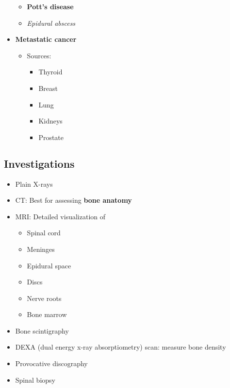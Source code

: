 \documentclass[
  12pt,
]{memoir}
\providecommand{\tightlist}{%
  \setlength{\itemsep}{0pt}\setlength{\parskip}{0pt}}
\begin{document}
\begin{itemize}
  \begin{itemize}
  \tightlist
  \item
    \textbf{Pott's disease}
  \item
    \emph{Epidural abscess}
  \end{itemize}
\item
  \textbf{Metastatic cancer}

  \begin{itemize}
  \tightlist
  \item
    Sources:

    \begin{itemize}
    \tightlist
    \item
      Thyroid
    \item
      Breast
    \item
      Lung
    \item
      Kidneys
    \item
      Prostate
    \end{itemize}
  \end{itemize}
\end{itemize}

\hypertarget{investigations-1}{%
\subsection{Investigations}\label{investigations-1}}

\begin{itemize}
\tightlist
\item
  Plain X-rays
\item
  CT: Best for assessing \textbf{bone anatomy}
\item
  MRI: Detailed visualization of

  \begin{itemize}
  \tightlist
  \item
    Spinal cord
  \item
    Meninges
  \item
    Epidural space
  \item
    Discs
  \item
    Nerve roots
  \item
    Bone marrow
  \end{itemize}
\item
  Bone scintigraphy
\item
  DEXA (dual energy x-ray absorptiometry) scan: measure bone density
\item
  Provocative discography
\item
  Spinal biopsy
\end{itemize}
\end{document}

